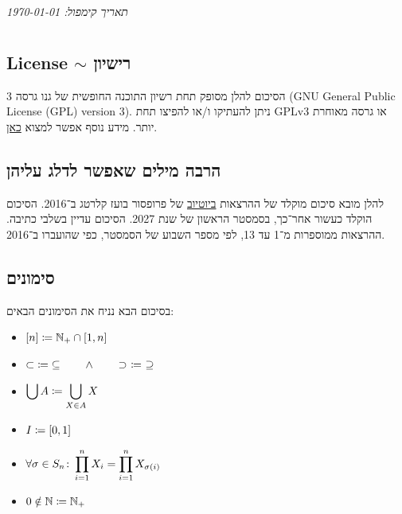 \documentclass[name=רשימות פונקציות ממשיות – WIP]{../../../tex/classes/noChapterMegasumPreamble}
\author{שחר פרץ}
\title{\name}
\date{2026 סמסטר ב'}
\begin{document}
	\renewcommand{\footrule}{\rule{\linewidth-19pt}{0.25pt}\vspace{-5pt}}
	\newpage

	\hfil \textit{תאריך קימפול: \today}

	\setcounter{section}{-1}
\section[מבוא למבוא]{}
\subsection[רישיון]{License $\sim$ רישיון}

	הסיכום להלן מסופק תחת רשיון התוכנה החופשית של גנו גרסה 3 (GNU General Public License (GPL) version 3). ניתן להעתיקו ו/או להפיצו תחת GPLv3 או גרסה מאוחרת יותר. מידע נוסף אפשר למצוא \href{https://www.gnu.org/licenses}{כאן}.

\subsection{הרבה מילים שאפשר לדלג עליהן}
	להלן מובא סיכום מוקלד של ההרצאות \href{https://youtu.be/CrTJoGaCI8U?si=Ccje3Wyot-WmqLMW}{ביוטיוב} של פרופסור בועז קלרטג ב־2016. הסיכום הוקלד כעשור אחר־כך, בסמסטר הראשון של שנת 2027. {\color{red} הסיכום עדיין בשלבי כתיבה}. ההרצאות ממוספרות מ־1 עד 13, לפי מספר השבוע של הסמסטר, כפי שהועברו ב־2016. 


\subsection{סימונים}
	בסיכום הבא נניח את הסימונים הבאים:
	\begin{itemize}
		\item \hfil $[n] \coloneqq \mathbb{N}_+ \cap [1, n]$
		\item \hfil $\subset \; \coloneqq \; \subseteq \quad\quad \land \quad\quad \supset \ \coloneqq \ \supseteq$
		\item \hfil $\displaystyle \bigcup A \coloneqq \bigcup_{X \in A}X$
		\item \hfil $I \coloneqq [0, 1]$
		\item \hfil $\displaystyle \forall \sigma \in S_n \colon \prod_{i = 1}^{n}X_i = \prod_{i = 1}^{n}X_{\sigma(i)}$
		\item \hfil $0 \notin \mathbb{N}\coloneqq \mathbb{N}_+$
	\end{itemize}
\end{document}
